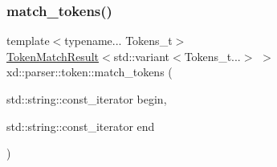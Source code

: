 \subsubsection{\texorpdfstring{match\+\_\+tokens()}{match\_tokens()}}
{\footnotesize\ttfamily template$<$typename... Tokens\+\_\+t$>$ \\
\mbox{\hyperlink{namespacexd_1_1parser_1_1token_a766c52bbfb7cb1f08498ef0bb9ec756e}{Token\+Match\+Result}}$<$std\+::variant$<$Tokens\+\_\+t...$>$ $>$ xd\+::parser\+::token\+::match\+\_\+tokens (\begin{DoxyParamCaption}\item[{std\+::string\+::const\+\_\+iterator}]{begin,  }\item[{std\+::string\+::const\+\_\+iterator}]{end }\end{DoxyParamCaption})}

